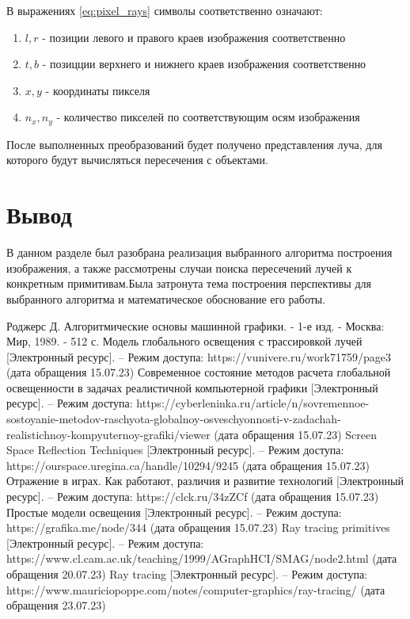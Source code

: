 \documentclass[a4paper,14pt,unknownkeysallowed]{extreport}
\begin{document}
В выражениях \ref{eq:pixel_rays} символы соответственно означают:
\begin{enumerate}
	\item $l,r$ - позиции левого  и правого краев изображения соответственно
	\item $t,b$ - позицции верхнего и нижнего краев изображения соответственно
	\item $x,y$ - координаты пикселя
	\item $n_x,n_y$ - количество пикселей по соответствующим осям изображения
\end{enumerate}
После выполненных преобразований будет получено представления луча, для которого будут вычисляться
пересечения с объектами.\cite{perspective_raytracing}

\section{Вывод}
В данном разделе был разобрана реализация выбранного алгоритма построения изображения, а также рассмотрены случаи поиска пересечений лучей  к конкретным примитивам.Была затронута 
тема построения перспективы для выбранного алгоритма и математическое обоснование его работы.














\begin{thebibliography}{9}
	Роджерс Д. Алгоритмические основы машинной графики. - 1-е изд. - Москва: Мир, 1989. - 512 с.
	Модель глобального освещения с трассировкой лучей [Электронный ресурс]. – Режим доступа: https://vunivere.ru/work71759/page3 (дата обращения 15.07.23)
	Современное состояние методов расчета глобальной освещенности в задачах реалистичной компьютерной графики [Электронный ресурс]. – Режим доступа: https://cyberleninka.ru/article/n/sovremennoe-sostoyanie-metodov-raschyota-globalnoy-osveschyonnosti-v-zadachah-realistichnoy-kompyuternoy-grafiki/viewer (дата обращения 15.07.23)
	Screen Space Reflection Techniques [Электронный ресурс]. – Режим доступа: https://ourspace.uregina.ca/handle/10294/9245 (дата обращения 15.07.23)
	Отражение в играх. Как работают, различия и развитие технологий [Электронный ресурс]. – Режим доступа: https://clck.ru/34zZCf (дата обращения 15.07.23)
	Простые модели освещения  [Электронный ресурс]. – Режим доступа: https://grafika.me/node/344 (дата обращения 15.07.23)
	Ray tracing primitives  [Электронный ресурс]. – Режим доступа: https://www.cl.cam.ac.uk/teaching/1999/AGraphHCI/SMAG/node2.html (дата обращения 20.07.23)
	Ray tracing  [Электронный ресурс]. – Режим доступа: https://www.mauriciopoppe.com/notes/computer-graphics/ray-tracing/ (дата обращения 23.07.23)


\end{thebibliography}

\end{document}
